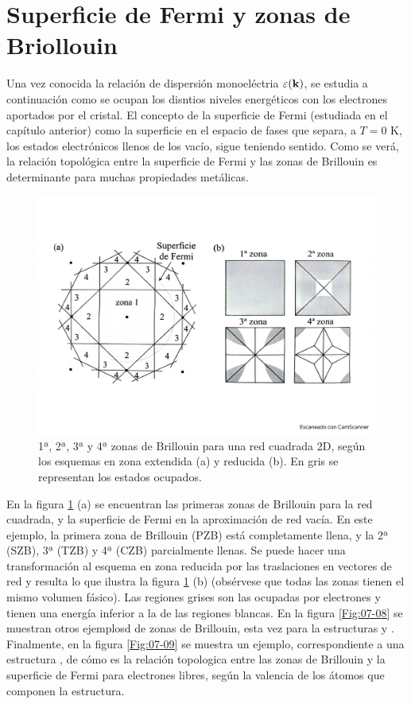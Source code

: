 \section{Superficie de Fermi y zonas de Briollouin}

Una vez conocida la relación de dispersión monoeléctria $\varepsilon(\mathbf{k})$, se estudia a continuación como se ocupan los disntios niveles energéticos con los electrones aportados por el cristal. El concepto de la superficie de Fermi (estudiada en el capítulo anterior) como la superficie en el espacio de fases que separa, a $T=0$ K, los estados electrónicos llenos de los vacío, sigue teniendo sentido. Como se verá, la relación topológica entre la superficie de Fermi y las zonas de Brillouin es determinante para muchas propiedades metálicas.

\begin{figure}[h!] \centering
    \includegraphics[scale=0.35]{Cuerpo/Ch_07/Fotos libro 7.pdf}
    \caption{1ª, 2ª, 3ª y 4ª zonas de Brillouin para una red cuadrada 2D, según los esquemas en zona extendida (a) y reducida (b). En gris se representan los estados ocupados.}
    \label{Fig:07-07}
\end{figure}    

En la figura \ref{Fig:07-07} (a) se encuentran las primeras zonas de Brillouin para la red cuadrada, y la superficie de Fermi en la aproximación de red vacía. En este ejemplo, la primera zona de Brillouin (PZB) está completamente llena, y la 2ª (SZB), 3ª (TZB) y 4ª (CZB) parcialmente llenas. Se puede hacer una transformación al esquema en zona reducida por las traslaciones en vectores de red y resulta lo que ilustra la figura \ref{Fig:07-07} (b) (obsérvese que todas las zonas tienen el mismo volumen fásico). Las regiones grises son las ocupadas por electrones y tienen una energía inferior a la de las regiones blancas. En la figura \ref{Fig:07-08} se muestran otros ejemplosd de zonas de Brillouin, esta vez para la estructuras \bcc y \fcc. Finalmente, en la figura \ref{Fig:07-09} se muestra un ejemplo, correspondiente a una estructura \fcc, de cómo es la relación topologica entre las zonas de Brillouin y la superficie de Fermi para electrones libres, según la valencia de los átomos que componen la estructura. 

